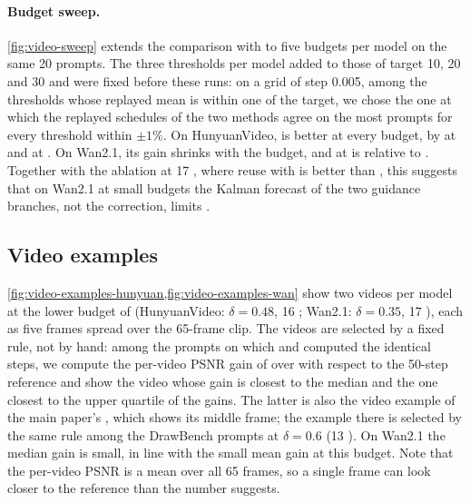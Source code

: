 

\paragraph{Budget sweep.}
\cref{fig:video-sweep} extends the comparison with \seacache to five budgets per model on the same 20 prompts. The three
thresholds per model added to those of  target 10, 20 and 30 \nfe and were fixed before these
runs: on a grid of step 0.005, among the thresholds whose replayed mean \nfe is within one of the target, we chose the one
at which the replayed schedules of the two methods agree on the most prompts for every threshold within $\pm1\%$. On
HunyuanVideo, \ours is better at every budget, by \suppVidSweepLowGainH{} at \suppVidSweepLowNfeH{} \nfe and
\suppVidSweepHighGainH{} at \suppVidSweepHighNfeH. On Wan2.1, its gain shrinks with the budget, and at
\suppVidSweepLowNfeW{} \nfe \ours is \suppVidSweepLowGainW{} relative to \seacache. Together with the ablation at 17
\nfe, where reuse with \pcgs is better than \ours, this suggests that on Wan2.1 at small budgets the Kalman forecast
of the two guidance branches, not the correction, limits \ours.

\subsection{Video examples}
\label{supp:video-examples}
\cref{fig:video-examples-hunyuan,fig:video-examples-wan} show two videos per model at the lower budget of
 (HunyuanVideo: $\delta=0.48$, 16 \nfe; Wan2.1: $\delta=0.35$, 17 \nfe), each as five frames
spread over the 65-frame clip. The videos are selected by a fixed rule, not by hand: among the prompts on which
\seacache and \ours computed the identical steps, we compute the per-video PSNR gain of \ours over \seacache with
respect to the 50-step reference and show the video whose gain is closest to the median and the one closest to the
upper quartile of the gains. The latter is also the video example of the main paper's ,
which shows its middle frame; the \flux example there is selected by the same rule among the DrawBench prompts at
$\delta=0.6$ (13 \nfe). On Wan2.1 the median gain is small, in line with the small mean gain at this budget. Note
that the per-video PSNR is a mean over all 65 frames, so a single frame can look closer to the reference than the
number suggests.

